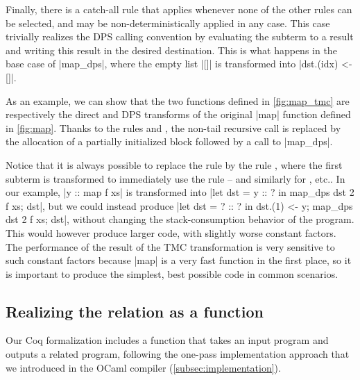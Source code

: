 Finally, there is a catch-all rule  that applies whenever none of the other rules can be selected, and may be non-deterministically applied in any case. This case trivially realizes the DPS calling convention by evaluating the subterm to a result and writing this result in the desired destination. This is what happens in the base case of \ocaml|map_dps|, where the empty list \ocaml|[]| is transformed into \ocaml|dst.(idx) <- []|.

\medskip



As an example, we can show that the two \DataLang functions defined in \cref{fig:map_tmc} are respectively the direct and DPS transforms of the original \datalang|map| function defined in \cref{fig:map}.
Thanks to the rules  and , the non-tail recursive call is replaced by the allocation of a partially initialized block followed by a call to \datalang|map_dps|.


Notice that it is always possible to replace the rule  by the rule , where the first subterm is transformed to immediately use the rule  -- and similarly for , etc.. In our example, \ocaml|y :: map f xs| is transformed into \ocaml|let dst = y :: ? in map_dps dst 2 f xs; dst|, but we could instead produce \ocaml|let dst = ? :: ? in dst.(1) <- y; map_dps dst 2 f xs; dst|, without changing the stack-consumption behavior of the program. This would however produce larger code, with slightly worse constant factors. The performance of the result of the TMC transformation is very sensitive to such constant factors because \ocaml|map| is a very fast function in the first place, so it is important to produce the simplest, best possible code in common scenarios.

\subsection{Realizing the relation as a function}

Our Coq formalization includes a function that takes an input program and outputs a related program, following the one-pass implementation approach that we introduced in the OCaml compiler (\cref{subsec:implementation}).

